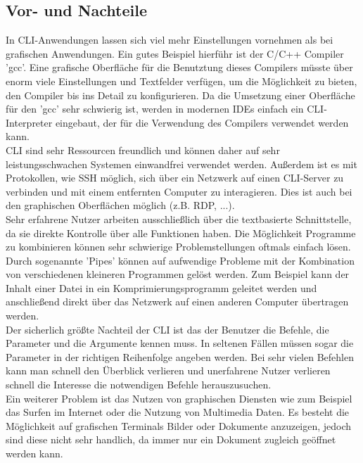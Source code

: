 \documentclass[12pt,a4paper]{report}
\begin{document}
\begin{onehalfspace}
\subsection{Vor- und Nachteile}

In CLI-Anwendungen lassen sich viel mehr Einstellungen vornehmen als bei grafischen Anwendungen. Ein gutes Beispiel hierführ ist der C/C++ Compiler 'gcc'. Eine grafische Oberfläche für die Benutztung dieses Compilers müsste über enorm viele Einstellungen und Textfelder verfügen, um die Möglichkeit zu bieten, den Compiler bis ins Detail zu konfigurieren. Da die Umsetzung einer Oberfläche für den 'gcc' sehr schwierig ist, werden in modernen IDEs einfach ein CLI-Interpreter eingebaut, der für die Verwendung des Compilers verwendet werden kann.\\

CLI sind sehr Ressourcen freundlich und können daher auf sehr leistungsschwachen Systemen einwandfrei verwendet werden. Außerdem ist es mit Protokollen, wie SSH möglich, sich über ein Netzwerk auf einen CLI-Server zu verbinden und mit einem entfernten Computer zu interagieren. Dies ist auch bei den graphischen Oberflächen möglich (z.B. RDP, ...).\\

Sehr erfahrene Nutzer arbeiten ausschließlich über die textbasierte Schnittstelle, da sie direkte Kontrolle über alle Funktionen haben. Die Möglichkeit Programme zu kombinieren können sehr schwierige Problemstellungen oftmals einfach lösen. Durch sogenannte 'Pipes' können auf aufwendige Probleme mit der Kombination von verschiedenen kleineren Programmen gelöst werden. Zum Beispiel kann der Inhalt einer Datei in ein Komprimierungsprogramm geleitet werden und anschließend direkt über das Netzwerk auf einen anderen Computer übertragen werden.\\

Der sicherlich größte Nachteil der CLI ist das der Benutzer die Befehle, die Parameter und die Argumente kennen muss. In seltenen Fällen müssen sogar die Parameter in der richtigen Reihenfolge angeben werden. Bei sehr vielen Befehlen kann man schnell den Überblick verlieren und unerfahrene Nutzer verlieren schnell die Interesse die notwendigen Befehle herauszusuchen.\\

Ein weiterer Problem ist das Nutzen von graphischen Diensten wie zum Beispiel das Surfen im Internet oder die Nutzung von Multimedia Daten. Es besteht die Möglichkeit auf grafischen Terminals Bilder oder Dokumente anzuzeigen, jedoch sind diese nicht sehr handlich, da immer nur ein Dokument zugleich geöffnet werden kann.\\


\end{onehalfspace}
\end{document}
